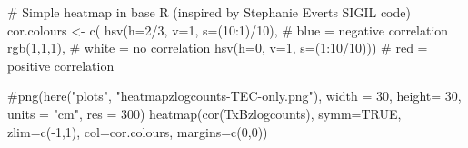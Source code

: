\documentclass[
  letterpaper,
  DIV=11,
  numbers=noendperiod]{scrreprt}
\newenvironment{Shaded}{\begin{snugshade}}{\end{snugshade}}
\newcommand{\AttributeTok}[1]{\textcolor[rgb]{0.40,0.45,0.13}{#1}}
\newcommand{\CommentTok}[1]{\textcolor[rgb]{0.37,0.37,0.37}{#1}}
\newcommand{\ConstantTok}[1]{\textcolor[rgb]{0.56,0.35,0.01}{#1}}
\newcommand{\DecValTok}[1]{\textcolor[rgb]{0.68,0.00,0.00}{#1}}
\newcommand{\FunctionTok}[1]{\textcolor[rgb]{0.28,0.35,0.67}{#1}}
\newcommand{\NormalTok}[1]{\textcolor[rgb]{0.00,0.23,0.31}{#1}}
\newcommand{\OtherTok}[1]{\textcolor[rgb]{0.00,0.23,0.31}{#1}}
\newcommand{\SpecialCharTok}[1]{\textcolor[rgb]{0.37,0.37,0.37}{#1}}
\begin{document}
\begin{Shaded}
\begin{Highlighting}[]
\CommentTok{\# Simple heatmap in base R (inspired by Stephanie Evert\textquotesingle{}s SIGIL code)}
\NormalTok{cor.colours }\OtherTok{\textless{}{-}} \FunctionTok{c}\NormalTok{(}
  \FunctionTok{hsv}\NormalTok{(}\AttributeTok{h=}\DecValTok{2}\SpecialCharTok{/}\DecValTok{3}\NormalTok{, }\AttributeTok{v=}\DecValTok{1}\NormalTok{, }\AttributeTok{s=}\NormalTok{(}\DecValTok{10}\SpecialCharTok{:}\DecValTok{1}\NormalTok{)}\SpecialCharTok{/}\DecValTok{10}\NormalTok{), }\CommentTok{\# blue = negative correlation }
  \FunctionTok{rgb}\NormalTok{(}\DecValTok{1}\NormalTok{,}\DecValTok{1}\NormalTok{,}\DecValTok{1}\NormalTok{), }\CommentTok{\# white = no correlation }
  \FunctionTok{hsv}\NormalTok{(}\AttributeTok{h=}\DecValTok{0}\NormalTok{, }\AttributeTok{v=}\DecValTok{1}\NormalTok{, }\AttributeTok{s=}\NormalTok{(}\DecValTok{1}\SpecialCharTok{:}\DecValTok{10}\SpecialCharTok{/}\DecValTok{10}\NormalTok{))) }\CommentTok{\# red = positive correlation}

\CommentTok{\#png(here("plots", "heatmapzlogcounts{-}TEC{-}only.png"), width = 30, height= 30, units = "cm", res = 300)}
\FunctionTok{heatmap}\NormalTok{(}\FunctionTok{cor}\NormalTok{(TxBzlogcounts), }
        \AttributeTok{symm=}\ConstantTok{TRUE}\NormalTok{, }
        \AttributeTok{zlim=}\FunctionTok{c}\NormalTok{(}\SpecialCharTok{{-}}\DecValTok{1}\NormalTok{,}\DecValTok{1}\NormalTok{), }
        \AttributeTok{col=}\NormalTok{cor.colours, }
        \AttributeTok{margins=}\FunctionTok{c}\NormalTok{(}\DecValTok{0}\NormalTok{,}\DecValTok{0}\NormalTok{))}
\end{Highlighting}
\end{Shaded}
\end{document}
